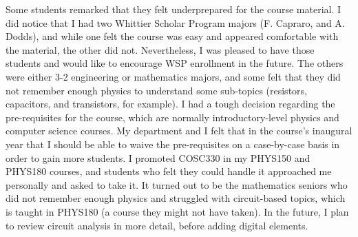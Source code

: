 \documentclass[../../main.tex]{subfiles}
\begin{document}
Some students remarked that they felt underprepared for the course material.  I did notice that I had two Whittier Scholar Program majors (F. Capraro, and A. Dodds), and while one felt the course was easy and appeared comfortable with the material, the other did not.  Nevertheless, I was pleased to have those students and would like to encourage WSP enrollment in the future.  The others were either 3-2 engineering or mathematics majors, and some felt that they did not remember enough physics to understand some sub-topics (resistors, capacitors, and transistors, for example).  I had a tough decision regarding the pre-requisites for the course, which are normally introductory-level physics and computer science courses.  My department and I felt that in the course's inaugural year that I should be able to waive the pre-requisites on a case-by-case basis in order to gain more students.  I promoted COSC330 in my PHYS150 and PHYS180 courses, and students who felt they could handle it approached me personally and asked to take it. It turned out to be the mathematics seniors who did not remember enough physics and struggled with circuit-based topics, which is taught in PHYS180 (a course they might not have taken).  In the future, I plan to review circuit analysis in more detail, before adding digital elements. \\ \hspace{0.1cm}

\end{document}
